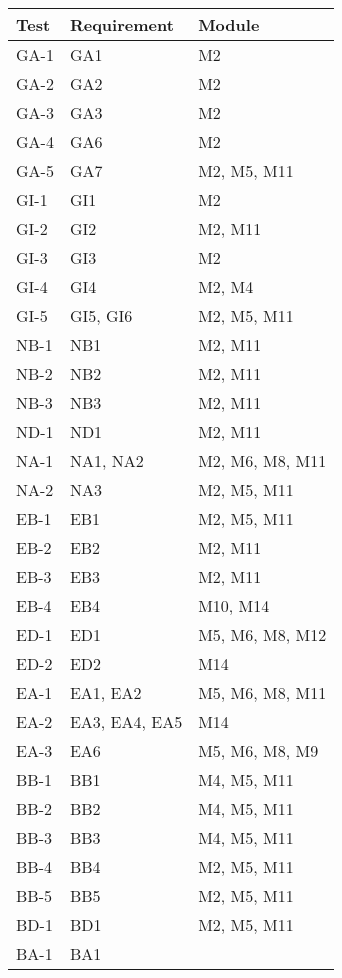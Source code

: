 \documentclass[12pt, titlepage]{article}
\begin{document}
\begin{longtable}{| p{} | p{} | p{}|}
  \hline
  Test & Requirement & Module\\
  \hline
  GA-1 & GA1 & M2\\
  \hline
  GA-2 & GA2 & M2\\
  \hline
  GA-3 & GA3 & M2\\
  \hline
  GA-4 & GA6 & M2\\
  \hline
  GA-5 & GA7 & M2, M5, M11\\
  \hline
  GI-1 & GI1 & M2\\
  \hline
  GI-2 & GI2 & M2, M11\\
  \hline
  GI-3 & GI3 & M2\\
  \hline
  GI-4 & GI4 & M2, M4\\
  \hline
  GI-5 & GI5, GI6 & M2, M5, M11\\
  \hline
  NB-1 & NB1 & M2, M11\\
  \hline
  NB-2 & NB2 & M2, M11\\
  \hline
  NB-3 & NB3 & M2, M11\\
  \hline
  ND-1 & ND1 & M2, M11\\
  \hline
  NA-1 & NA1, NA2 & M2, M6, M8, M11\\
  \hline
  NA-2 & NA3 & M2, M5, M11\\
  \hline
  EB-1 & EB1 & M2, M5, M11\\
  \hline
  EB-2 & EB2 & M2, M11\\
  \hline
  EB-3 & EB3 & M2, M11\\
  \hline
  EB-4 & EB4 & M10, M14\\
  \hline
  ED-1 & ED1 & M5, M6, M8, M12\\
  \hline
  ED-2 & ED2 & M14\\
  \hline
  EA-1 & EA1, EA2 & M5, M6, M8, M11\\
  \hline
  EA-2 & EA3, EA4, EA5 & M14\\
  \hline
  EA-3 & EA6 & M5, M6, M8, M9\\
  \hline
  BB-1 & BB1 & M4, M5, M11\\
  \hline
  BB-2 & BB2 & M4, M5, M11\\
  \hline
  BB-3 & BB3 & M4, M5, M11\\
  \hline
  BB-4 & BB4 & M2, M5, M11\\
  \hline
  BB-5 & BB5 & M2, M5, M11\\
  \hline
  BD-1 & BD1 &  M2, M5, M11\\
  \hline
  BA-1 & BA1 &\\

\end{longtable}
\end{document}

